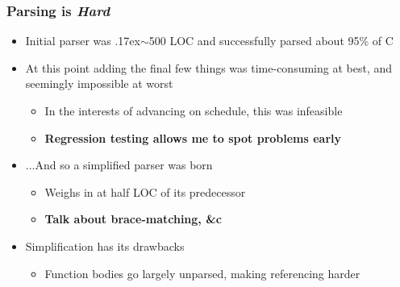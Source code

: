 \documentclass[handout]{beamer}
\begin{document}

  \begin{frame}
    \frametitle{Parsing is \emph{Hard}}
    \begin{itemize}
      \item Initial parser was {\raise.17ex\hbox{$\scriptstyle\sim$}}500 LOC and
        successfully parsed about 95\% of C
      \item At this point adding the final few things was time-consuming at
        best, and seemingly impossible at worst
        \begin{itemize}
          \item In the interests of advancing on schedule, this was infeasible
          \item \textbf{Regression testing allows me to spot problems early}
        \end{itemize}
      \item ...And so a simplified parser was born
        \begin{itemize}
          \item Weighs in at half LOC of its predecessor
          \item \textbf{Talk about brace-matching, \&c}
        \end{itemize}
      \item Simplification has its drawbacks
        \begin{itemize}
          \item Function bodies go largely unparsed, making referencing harder
        \end{itemize}
    \end{itemize}
  \end{frame}
\end{document}
